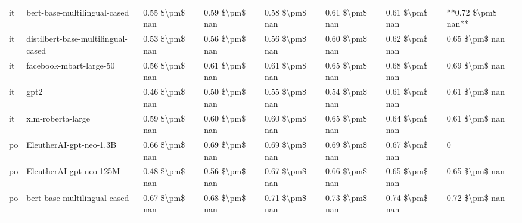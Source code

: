 \begin{tabular}{llllllll}
      it &       bert-base-multilingual-cased & 0.55 \$\textbackslash pm\$ nan &            0.59 \$\textbackslash pm\$ nan &        0.58 \$\textbackslash pm\$ nan &         0.61 \$\textbackslash pm\$ nan &                          0.61 \$\textbackslash pm\$ nan & **0.72 \$\textbackslash pm\$ nan** \\
      it & distilbert-base-multilingual-cased & 0.53 \$\textbackslash pm\$ nan &            0.56 \$\textbackslash pm\$ nan &        0.56 \$\textbackslash pm\$ nan &         0.60 \$\textbackslash pm\$ nan &                          0.62 \$\textbackslash pm\$ nan &     0.65 \$\textbackslash pm\$ nan \\
      it &            facebook-mbart-large-50 & 0.56 \$\textbackslash pm\$ nan &            0.61 \$\textbackslash pm\$ nan &        0.61 \$\textbackslash pm\$ nan &         0.65 \$\textbackslash pm\$ nan &                          0.68 \$\textbackslash pm\$ nan &     0.69 \$\textbackslash pm\$ nan \\
      it &                               gpt2 & 0.46 \$\textbackslash pm\$ nan &            0.50 \$\textbackslash pm\$ nan &        0.55 \$\textbackslash pm\$ nan &         0.54 \$\textbackslash pm\$ nan &                          0.61 \$\textbackslash pm\$ nan &     0.61 \$\textbackslash pm\$ nan \\
      it &                  xlm-roberta-large & 0.59 \$\textbackslash pm\$ nan &            0.60 \$\textbackslash pm\$ nan &        0.60 \$\textbackslash pm\$ nan &         0.65 \$\textbackslash pm\$ nan &                          0.64 \$\textbackslash pm\$ nan &     0.61 \$\textbackslash pm\$ nan \\
      po &            EleutherAI-gpt-neo-1.3B & 0.66 \$\textbackslash pm\$ nan &            0.69 \$\textbackslash pm\$ nan &        0.69 \$\textbackslash pm\$ nan &         0.69 \$\textbackslash pm\$ nan &                          0.67 \$\textbackslash pm\$ nan &                  0 \\
      po &            EleutherAI-gpt-neo-125M & 0.48 \$\textbackslash pm\$ nan &            0.56 \$\textbackslash pm\$ nan &        0.67 \$\textbackslash pm\$ nan &         0.66 \$\textbackslash pm\$ nan &                          0.65 \$\textbackslash pm\$ nan &     0.65 \$\textbackslash pm\$ nan \\
      po &       bert-base-multilingual-cased & 0.67 \$\textbackslash pm\$ nan &            0.68 \$\textbackslash pm\$ nan &        0.71 \$\textbackslash pm\$ nan &         0.73 \$\textbackslash pm\$ nan &                          0.74 \$\textbackslash pm\$ nan &     0.72 \$\textbackslash pm\$ nan \\

\end{tabular}
